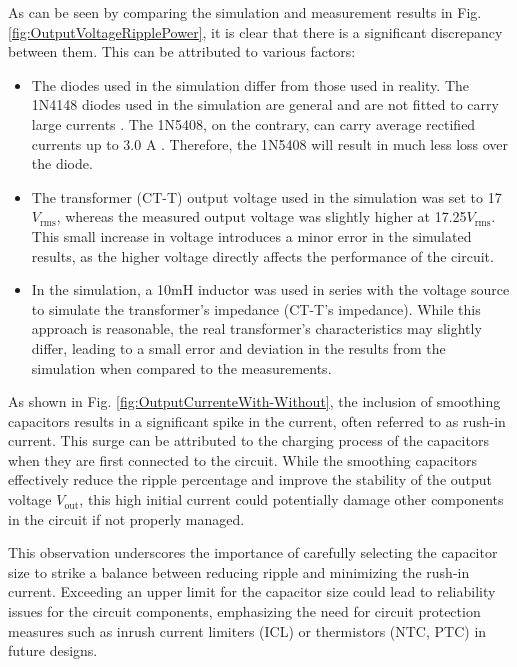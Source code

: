As can be seen by comparing the simulation and measurement results in Fig. \ref{fig:OutputVoltageRipplePower}, it is clear that there is a significant discrepancy between them. This can be attributed to various factors:
\begin{itemize}
    \item The diodes used in the simulation differ from those used in reality. The 1N4148 diodes used in the simulation are general and are not fitted to carry large currents \cite{1n4148}. The 1N5408, on the contrary, can carry average rectified currents up to 3.0 A \cite{1n5408}. Therefore, the 1N5408 will result in much less loss over the diode.
    \item The transformer (CT-T) output voltage used in the simulation was set to 17${V_{\text{rms}}}$, whereas the measured output voltage was slightly higher at 17.25${V_\text{rms}}$. This small increase in voltage introduces a minor error in the simulated results, as the higher voltage directly affects the performance of the circuit.
    \item In the simulation, a 10mH inductor was used in series with the voltage source to simulate the transformer's impedance (CT-T's impedance). While this approach is reasonable, the real transformer's characteristics may slightly differ, leading to a small error and deviation in the results from the simulation when compared to the measurements.
\end{itemize}

As shown in Fig. \ref{fig:OutputCurrenteWith-Without}, the inclusion of smoothing capacitors results in a significant spike in the current, often referred to as rush-in current. This surge can be attributed to the charging process of the capacitors when they are first connected to the circuit. While the smoothing capacitors effectively reduce the ripple percentage and improve the stability of the output voltage $V_{\text{out}}$, this high initial current could potentially damage other components in the circuit if not properly managed.

This observation underscores the importance of carefully selecting the capacitor size to strike a balance between reducing ripple and minimizing the rush-in current. Exceeding an upper limit for the capacitor size could lead to reliability issues for the circuit components, emphasizing the need for circuit protection measures such as inrush current limiters (ICL) or thermistors (NTC, PTC) in future designs. 

